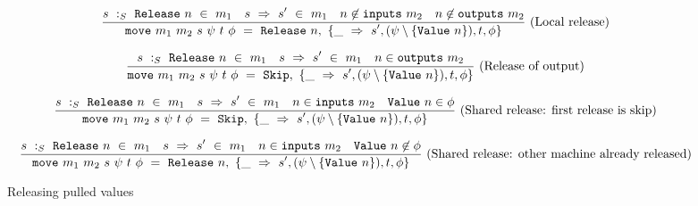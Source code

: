 \begin{figure*}


$$
\ruleI
{
        \CheckStateTypeM{m_1}{s}{\Release{n}}
        \quad
        \TransUM{s}{s'}{m_1}
        \quad
        n \not\in \inputs{m_2}
        \quad
        n \not\in \outputs{m_2}
}
{
    \MoveOut
        {\sptp}
        {\Release{n}}
        { 
          \MoveTU{s', (\psi \setminus \{\Value{n}\}), t, \phi }
         }
}
\textrm{(Local release)}
$$

$$
\ruleI
{
        \CheckStateTypeM{m_1}{s}{\Release{n}}
        \quad
        \TransUM{s}{s'}{m_1}
        \quad
        n \in \outputs{m_2}
}
{
    \MoveOut
        {\sptp}
        {\Skip}
        { 
          \MoveTU{s', (\psi \setminus \{\Value{n}\}), t, \phi }
         }
}
\textrm{(Release of output)}
$$

$$
\ruleI
{
        \CheckStateTypeM{m_1}{s}{\Release{n}}
        \quad
        \TransUM{s}{s'}{m_1}
        \quad
        n \in \inputs{m_2}
        \quad
        \Value{n} \in \phi
}
{
    \MoveOut
        {\sptp}
        {\Skip}
        { 
          \MoveTU{s', (\psi \setminus \{\Value{n}\}), t, \phi }
         }
}
\textrm{(Shared release: first release is skip)}
$$

$$
\ruleI
{
        \CheckStateTypeM{m_1}{s}{\Release{n}}
        \quad
        \TransUM{s}{s'}{m_1}
        \quad
        n \in \inputs{m_2}
        \quad
        \Value{n} \not\in \phi
}
{
    \MoveOut
        {\sptp}
        {\Release{n}}
        { 
          \MoveTU{s', (\psi \setminus \{\Value{n}\}), t, \phi }
         }
}
\textrm{(Shared release: other machine already released)}
$$


\caption{Releasing pulled values}
\label{fig:merge:gen:release}
\end{figure*}

